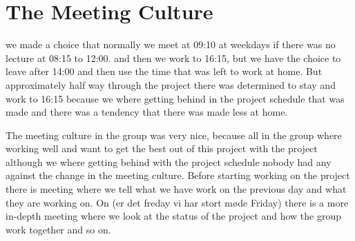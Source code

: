 \section{The Meeting Culture}
we made a choice that normally we meet at 09:10 at weekdays if there was no lecture at 08:15 to 12:00. and then we work to 16:15, but we have the choice to leave after 14:00 and then use the time that was left to work at home. But approximately half way through the project there was determined to stay and work to 16:15 because we where getting behind in the project schedule that was made and there was a tendency that there was made less at home.

The meeting culture in the group was very nice, because all in the group where working well and want to get the best out of this project with the project although we where getting behind with the project schedule nobody had any against the change in the meeting culture. Before starting working on the project there is meeting where we tell what we have work on the previous day and what they are working on. On \fxfatal(er det freday vi har stort møde Friday) there is a more in-depth meeting where we look at the status of the project and how the group work together and so on.